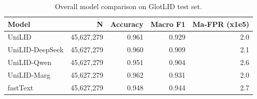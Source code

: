 \begin{table}[htbp]
\centering
\small
\begin{tabular}{lrrrr}
\toprule
\textbf{Model} & \textbf{N} & \textbf{Accuracy} & \textbf{Macro F1} & \textbf{Ma-FPR (x1e5)} \\
\midrule
UniLID & 45,627,279 & 0.961 & 0.929 & 2.0 \\
UniLID-DeepSeek & 45,627,279 & 0.960 & 0.909 & 2.1 \\
UniLID-Qwen & 45,627,279 & 0.951 & 0.904 & 2.6 \\
UniLID-Marg & 45,627,279 & 0.962 & 0.931 & 2.0 \\
fastText & 45,627,279 & 0.948 & 0.944 & 2.7 \\
\bottomrule
\end{tabular}
\caption{Overall model comparison on GlotLID test set.}
\label{tab:overall}
\end{table}